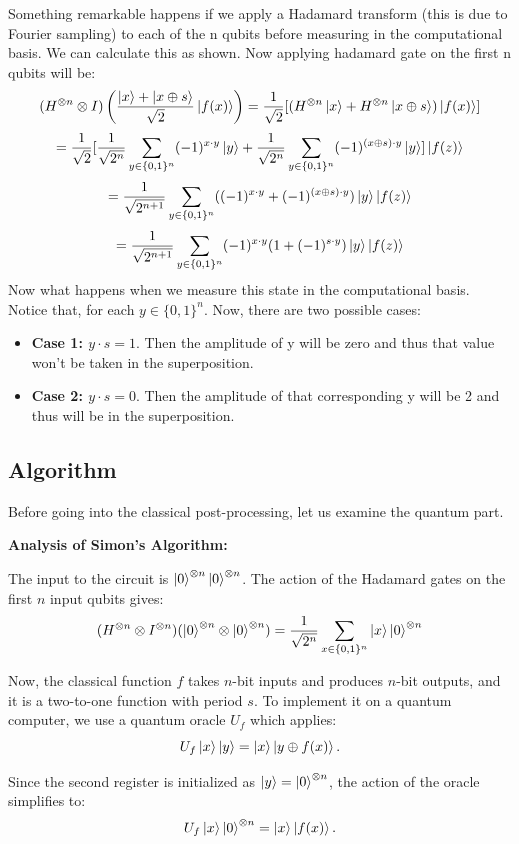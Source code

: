 Something remarkable happens if we apply a Hadamard transform (this is due to Fourier sampling) to each of the n qubits before measuring in the computational basis. We can calculate this as shown.
Now applying hadamard gate on the first n qubits will be:
\[
    (H^{\otimes n}\otimes I)\left(\frac{\ket{x}+\ket{x\oplus s}}{\sqrt{2}}\ket{f(x)}\right)=\frac{1}{\sqrt{2}}[(H^{\otimes n}\ket{x}+H^{\otimes n}\ket{x\oplus s})\ket{f(x)}]
\]
\[
    =\frac{1}{\sqrt{2}}[\frac{1}{\sqrt{2^n}}\sum_{y \in \{0,1\}^n}(-1)^{x\cdot y}\ket{y}+\frac{1}{\sqrt{2^n}}\sum_{y \in \{0,1\}^n}(-1)^{(x\oplus s)\cdot y}\ket{y}]\ket{f(z)}
\]
\[
    =\frac{1}{\sqrt{2^{n+1}}}\sum_{y \in \{0,1\}^n}((-1)^{x\cdot y}+(-1)^{(x\oplus s) \cdot y})\ket{y}\ket{f(z)}
\]
\[
    =\frac{1}{\sqrt{2^{n+1}}}\sum_{y \in \{0,1\}^n}(-1)^{x\cdot y}(1+(-1)^{s\cdot y})\ket{y}\ket{f(z)}
\]
Now what happens when we measure this state in the computational basis. Notice that, for each $y\in\{0,1\}^n$. Now, there are two possible cases:
\begin{itemize}
    \item \textbf{Case 1: $y\cdot s=1$}. Then the amplitude of y will be zero and thus that value won't be taken in the superposition.
    \item \textbf{Case 2: $y\cdot s=0$}. Then the amplitude of that corresponding y will be 2 and thus will be in the superposition.
\end{itemize}

\subsection{Algorithm}

Before going into the classical post-processing, let us examine the quantum part.

\textbf{Analysis of Simon's Algorithm:}

The input to the circuit is $\ket{0}^{\otimes n}\ket{0}^{\otimes n}$. The action of the Hadamard gates on the first $n$ input qubits gives:
\[
(H^{\otimes n} \otimes I^{\otimes n})(\ket{0}^{\otimes n} \otimes \ket{0}^{\otimes n}) = \frac{1}{\sqrt{2^n}}\sum_{x \in \{0,1\}^n} \ket{x} \ket{0}^{\otimes n}
\]

Now, the classical function $f$ takes $n$-bit inputs and produces $n$-bit outputs, and it is a two-to-one function with period $s$. To implement it on a quantum computer, we use a quantum oracle $U_f$ which applies:
\[
U_f\ket{x}\ket{y} = \ket{x}\ket{y \oplus f(x)}.
\]

Since the second register is initialized as $\ket{y} = \ket{0}^{\otimes n}$, the action of the oracle simplifies to:
\[
U_f\ket{x}\ket{0}^{\otimes n} = \ket{x}\ket{f(x)}.
\]

